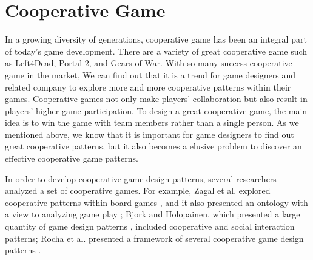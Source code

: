 \section{Cooperative Game}


In a growing diversity of generations, cooperative game has been an integral part of today's game development. There are a variety of great cooperative game such as Left4Dead, Portal 2, and Gears of War. With so many success cooperative game in the market, We can find out that it is a trend for game designers and related company to explore more and more cooperative patterns within their games. Cooperative games not only make players' collaboration but also result in players' higher game participation. To design a great cooperative game, the main idea is to win the game with team members rather than a single person. As we mentioned above, we know that it  is important for game designers to find out great cooperative patterns, but it also becomes a elusive problem to discover an effective cooperative game patterns.


In order to develop cooperative game design patterns, several researchers analyzed a set of cooperative games. For example, Zagal et al. explored cooperative patterns within board games \cite{1}, and it also presented an ontology with a view to analyzing game play \cite{3}; Bjork and Holopainen, which presented a large quantity of game design patterns \cite{2}, included cooperative and social interaction patterns; Rocha et al. presented a framework of several cooperative game design patterns \cite{4}.

